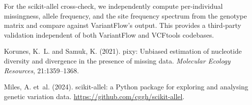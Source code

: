 \documentclass[11pt]{article}
\begin{document}
For the scikit-allel cross-check, we independently compute per-individual
missingness, allele frequency, and the site frequency spectrum from the
genotype matrix and compare against VariantFlow's output. This provides a
third-party validation independent of both VariantFlow and VCFtools codebases.

\begin{thebibliography}{}
Korunes, K.~L. and Samuk, K. (2021).
\newblock pixy: Unbiased estimation of nucleotide diversity and divergence in
  the presence of missing data.
\newblock \emph{Molecular Ecology Resources}, 21:1359--1368.

Miles, A. et~al. (2024).
\newblock scikit-allel: a {P}ython package for exploring and analysing genetic
  variation data.
\newblock \url{https://github.com/cggh/scikit-allel}.
\end{thebibliography}
\end{document}
